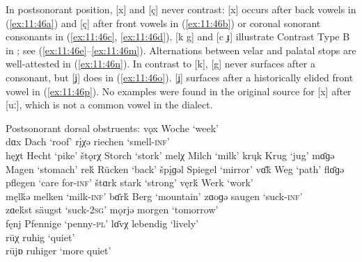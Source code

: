In postsonorant position, [x] and [ç] never contrast: [x] occurs after back vowels in (\ref{ex:11:46a}) and [ç] after front vowels in (\ref{ex:11:46b}) or coronal sonorant consonants in (\ref{ex:11:46c}, \ref{ex:11:46d}). [k g] and [c ɟ] illustrate Contrast Type B in ; see (\ref{ex:11:46e}--\ref{ex:11:46m}).  Alternations between velar and palatal stops are well-attested in (\ref{ex:11:46n}). In contrast to [k], [g] never surfaces after a consonant, but [ʝ] does in (\ref{ex:11:46o}). [ʝ] surfaces after a historically elided front vowel in (\ref{ex:11:46p}). No examples were found in the original source for [x] after [uː], which is not a common vowel in the dialect.

\ea%
\label{ex:11:46}Postsonorant dorsal obstruents:
\ea\label{ex:11:46a} vǫx        \tab [vɔx]    \tab Woche     \tab ‘week’ \\
    dɑx        \tab [dɑx]    \tab Dach      \tab ‘roof’ 
\ex\label{ex:11:46b} r\k{i}χə   \tab [rɪçə]   \tab riechen   \tab ‘smell-\textsc{inf}’ \\
    hęχt       \tab [hɛçt]   \tab Hecht     \tab ‘pike’    
\ex\label{ex:11:46c} štǫrχ      \tab [ʃtɔrç]  \tab Storch    \tab ‘stork’   
\ex\label{ex:11:46d} melχ       \tab [melç]   \tab Milch     \tab ‘milk’    
\ex\label{ex:11:46e} krųk   \tab [krʊk]   \tab Krug      \tab ‘jug’     
\ex\label{ex:11:46f} mɑ̄ɡə       \tab [mɑːgə]  \tab Magen     \tab ‘stomach’ 
\ex\label{ex:11:46g} re\'{k}    \tab [rec]    \tab Rücken    \tab ‘back’    
\ex\label{ex:11:46h} šp\k{i}ɡəl \tab [ʃpɪɟəl] \tab Spiegel   \tab ‘mirror’  
\ex\label{ex:11:46i} vɑ̄\'{k}    \tab [vɑːc]   \tab Weg       \tab ‘path’    
\ex\label{ex:11:46j} flɑ̄ɡə      \tab [flɑːɟə] \tab pflegen   \tab ‘care for-\textsc{inf}’ 
\ex\label{ex:11:46k} štɑrk      \tab [ʃtɑːrk] \tab stark     \tab ‘strong’                
\ex\label{ex:11:46l} vęr\'{k}   \tab [vɛrc]   \tab Werk      \tab ‘work’                  \\
    męl\'{k}ə  \tab [mɛlcə]  \tab melken    \tab ‘milk-\textsc{inf}’ 
\ex\label{ex:11:46m} bɑ̄r\'{k}   \tab [bɑːrc]  \tab Berg      \tab ‘mountain’          
\ex\label{ex:11:46n} zɑoɡə      \tab [zɑogə]  \tab saugen    \tab ‘suck-\textsc{inf}’  \\
    zɑe\'{k}st \tab [zɑecst] \tab säugst    \tab ‘suck-\textsc{2sg}’ 
\ex\label{ex:11:46o} mǫrjə      \tab [mɔrʝə]  \tab morgen    \tab ‘tomorrow’ \\
    fęnj       \tab [fɛnʝ]   \tab Pfennige  \tab ‘penny-\textsc{pl}’  
\ex\label{ex:11:46p} lɑ̄vχ       \tab [lɑːvç]  \tab lebendig  \tab ‘lively’   \\
    rūχ        \tab [ruːç]   \tab ruhig     \tab ‘quiet’    \\
    rūjɒ       \tab [ruːʝɐ]  \tab ruhiger   \tab ‘more quiet’ 
\z 
\z 

